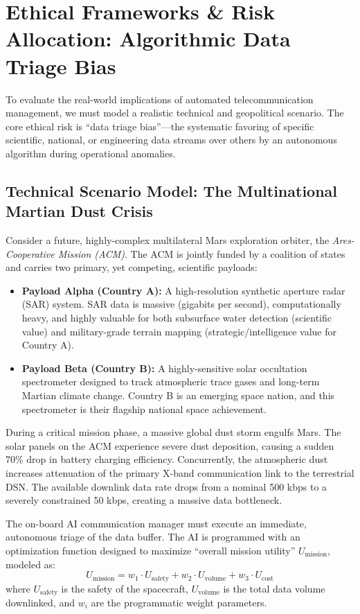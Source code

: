 \documentclass[final,5p,times,twocolumn]{elsarticle}
\begin{document}
\section{Ethical Frameworks \& Risk Allocation: Algorithmic Data Triage Bias}
\label{sec:ethics}

To evaluate the real-world implications of automated telecommunication management, we must model a realistic technical and geopolitical scenario. The core ethical risk is ``data triage bias''---the systematic favoring of specific scientific, national, or engineering data streams over others by an autonomous algorithm during operational anomalies.

\subsection{Technical Scenario Model: The Multinational Martian Dust Crisis}

Consider a future, highly-complex multilateral Mars exploration orbiter, the \textit{Ares-Cooperative Mission (ACM)}. The ACM is jointly funded by a coalition of states and carries two primary, yet competing, scientific payloads:
\begin{itemize}
\item \textbf{Payload Alpha (Country A):} A high-resolution synthetic aperture radar (SAR) system. SAR data is massive (gigabits per second), computationally heavy, and highly valuable for both subsurface water detection (scientific value) and military-grade terrain mapping (strategic/intelligence value for Country A).
\item \textbf{Payload Beta (Country B):} A highly-sensitive solar occultation spectrometer designed to track atmospheric trace gases and long-term Martian climate change. Country B is an emerging space nation, and this spectrometer is their flagship national space achievement.
\end{itemize}

During a critical mission phase, a massive global dust storm engulfs Mars. The solar panels on the ACM experience severe dust deposition, causing a sudden 70\% drop in battery charging efficiency. Concurrently, the atmospheric dust increases attenuation of the primary X-band communication link to the terrestrial DSN. The available downlink data rate drops from a nominal 500 kbps to a severely constrained 50 kbps, creating a massive data bottleneck.

The on-board AI communication manager must execute an immediate, autonomous triage of the data buffer. The AI is programmed with an optimization function designed to maximize ``overall mission utility'' $U_{\text{mission}}$, modeled as:
\begin{equation}
U_{\text{mission}} = w_1 \cdot U_{\text{safety}} + w_2 \cdot U_{\text{volume}} + w_3 \cdot U_{\text{cost}}
\label{eq:utility}
\end{equation}
where $U_{\text{safety}}$ is the safety of the spacecraft, $U_{\text{volume}}$ is the total data volume downlinked, and $w_i$ are the programmatic weight parameters.
\end{document}
